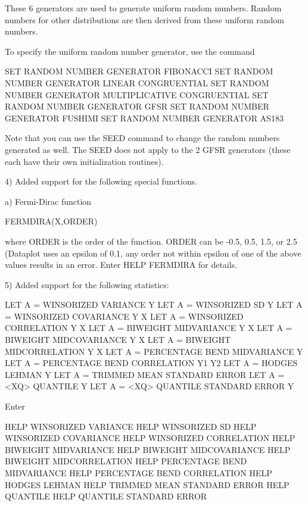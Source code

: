 {    These 6 generators are used to generate uniform random numbers.
    Random numbers for other distributions are then derived from
    these uniform random numbers.

    To specify the uniform random number generator, use the command

        SET RANDOM NUMBER GENERATOR FIBONACCI
        SET RANDOM NUMBER GENERATOR LINEAR CONGRUENTIAL
        SET RANDOM NUMBER GENERATOR MULTIPLICATIVE CONGRUENTIAL
        SET RANDOM NUMBER GENERATOR GFSR
        SET RANDOM NUMBER GENERATOR FUSHIMI
        SET RANDOM NUMBER GENERATOR AS183

    Note that you can use the SEED command to change the random numbers
    generated as well.  The SEED does not apply to the 2 GFSR
    generators (these each have their own initialization routines).

 4) Added support for the following special functions.

    a) Fermi-Dirac function

       FERMDIRA(X,ORDER)

       where ORDER is the order of the function.  ORDER can be
       -0.5, 0.5, 1.5, or 2.5 (Dataplot uses an epsilon of 0.1,
       any order not within epsilon of one of the above values
       results in an error.  Enter HELP FERMDIRA for details.

 5) Added support for the following statistics:

       LET A = WINSORIZED VARIANCE Y
       LET A = WINSORIZED SD Y
       LET A = WINSORIZED COVARIANCE Y X
       LET A = WINSORIZED CORRELATION Y X
       LET A = BIWEIGHT MIDVARIANCE Y X
       LET A = BIWEIGHT MIDCOVARIANCE Y X
       LET A = BIWEIGHT MIDCORRELATION Y X
       LET A = PERCENTAGE BEND MIDVARIANCE Y
       LET A = PERCENTAGE BEND CORRELATION Y1 Y2
       LET A = HODGES LEHMAN Y
       LET A = TRIMMED MEAN STANDARD ERROR
       LET A = <XQ> QUANTILE Y
       LET A = <XQ> QUANTILE STANDARD ERROR Y

    Enter

        HELP WINSORIZED VARIANCE
        HELP WINSORIZED SD
        HELP WINSORIZED COVARIANCE
        HELP WINSORIZED CORRELATION
        HELP BIWEIGHT MIDVARIANCE
        HELP BIWEIGHT MIDCOVARIANCE
        HELP BIWEIGHT MIDCORRELATION
        HELP PERCENTAGE BEND MIDVARIANCE
        HELP PERCENTAGE BEND CORRELATION
        HELP HODGES LEHMAN
        HELP TRIMMED MEAN STANDARD ERROR
        HELP QUANTILE
        HELP QUANTILE STANDARD ERROR

}
